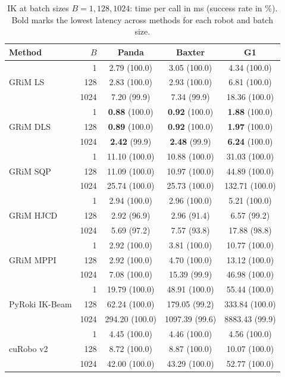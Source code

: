 \begin{table}[t]
  \centering
  \caption{IK at batch sizes $B=1,128,1024$: time per call in ms (success rate in \%). Bold marks the lowest latency across methods for each robot and batch size.}
  \label{tab:ik}
  \footnotesize
  \setlength{\tabcolsep}{2pt}
  \begin{tabular}{lrccc}
    \toprule
    Method & $B$ & Panda & Baxter & G1 \\
    \midrule
    \multirow{3}{*}{GRiM LS} & 1 & 2.79 (100.0) & 3.05 (100.0) & 4.34 (100.0) \\
     & 128 & 2.83 (100.0) & 2.93 (100.0) & 6.81 (100.0) \\
     & 1024 & 7.20 (99.9) & 7.34 (99.9) & 18.36 (100.0) \\
    \midrule
    \multirow{3}{*}{GRiM DLS} & 1 & \textbf{0.88} (100.0) & \textbf{0.92} (100.0) & \textbf{1.88} (100.0) \\
     & 128 & \textbf{0.89} (100.0) & \textbf{0.92} (100.0) & \textbf{1.97} (100.0) \\
     & 1024 & \textbf{2.42} (99.9) & \textbf{2.48} (99.9) & \textbf{6.24} (100.0) \\
    \midrule
    \multirow{3}{*}{GRiM SQP} & 1 & 11.10 (100.0) & 10.88 (100.0) & 31.03 (100.0) \\
     & 128 & 11.09 (100.0) & 10.97 (100.0) & 44.89 (100.0) \\
     & 1024 & 25.74 (100.0) & 25.73 (100.0) & 132.71 (100.0) \\
    \midrule
    \multirow{3}{*}{GRiM HJCD} & 1 & 2.94 (100.0) & 2.96 (100.0) & 5.21 (100.0) \\
     & 128 & 2.92 (96.9) & 2.96 (91.4) & 6.57 (99.2) \\
     & 1024 & 5.69 (97.2) & 7.57 (93.8) & 17.88 (98.8) \\
    \midrule
    \multirow{3}{*}{GRiM MPPI} & 1 & 2.92 (100.0) & 3.81 (100.0) & 10.77 (100.0) \\
     & 128 & 2.92 (100.0) & 4.70 (100.0) & 13.12 (100.0) \\
     & 1024 & 7.08 (100.0) & 15.39 (99.9) & 46.98 (100.0) \\
    \midrule
    \multirow{3}{*}{PyRoki IK-Beam} & 1 & 19.79 (100.0) & 48.91 (100.0) & 55.44 (100.0) \\
     & 128 & 62.24 (100.0) & 179.05 (99.2) & 333.84 (100.0) \\
     & 1024 & 294.20 (100.0) & 1097.39 (99.6) & 8883.43 (99.9) \\
    \midrule
    \multirow{3}{*}{cuRobo v2} & 1 & 4.45 (100.0) & 4.46 (100.0) & 4.56 (100.0) \\
     & 128 & 8.72 (100.0) & 8.87 (100.0) & 10.07 (100.0) \\
     & 1024 & 42.00 (100.0) & 43.29 (100.0) & 52.77 (100.0) \\
    \bottomrule
  \end{tabular}
\end{table}
